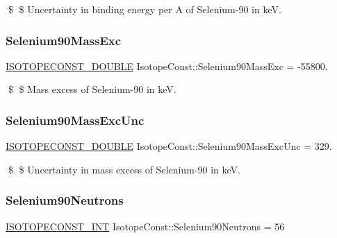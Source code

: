 \$ \$ Uncertainty in binding energy per A of Selenium-\/90 in keV. \mbox{\label{group___isotope_const-_selenium-_se90_gaf0964b72ce2550523481e12930ab65e2}} 
\subsubsection{\texorpdfstring{Selenium90\+Mass\+Exc}{Selenium90MassExc}}
{\footnotesize\ttfamily \mbox{\hyperlink{group___isotope_const-_macros_ga8f45a7272ce02c0b4c65c44636ed719a}{I\+S\+O\+T\+O\+P\+E\+C\+O\+N\+S\+T\+\_\+\+D\+O\+U\+B\+LE}} Isotope\+Const\+::\+Selenium90\+Mass\+Exc = -\/55800.}

\$ \$ Mass excess of Selenium-\/90 in keV. \mbox{\label{group___isotope_const-_selenium-_se90_ga39dfd7a80c3bd1274bdee4dfc44c1e4b}} 
\subsubsection{\texorpdfstring{Selenium90\+Mass\+Exc\+Unc}{Selenium90MassExcUnc}}
{\footnotesize\ttfamily \mbox{\hyperlink{group___isotope_const-_macros_ga8f45a7272ce02c0b4c65c44636ed719a}{I\+S\+O\+T\+O\+P\+E\+C\+O\+N\+S\+T\+\_\+\+D\+O\+U\+B\+LE}} Isotope\+Const\+::\+Selenium90\+Mass\+Exc\+Unc = 329.}

\$ \$ Uncertainty in mass excess of Selenium-\/90 in keV. \mbox{\label{group___isotope_const-_selenium-_se90_gab31e01884ac99c418c2c8a8d8fa561dc}} 
\subsubsection{\texorpdfstring{Selenium90\+Neutrons}{Selenium90Neutrons}}
{\footnotesize\ttfamily \mbox{\hyperlink{group___isotope_const-_macros_ga5f18360b3e99483a35c32d789e62621c}{I\+S\+O\+T\+O\+P\+E\+C\+O\+N\+S\+T\+\_\+\+I\+NT}} Isotope\+Const\+::\+Selenium90\+Neutrons = 56}

